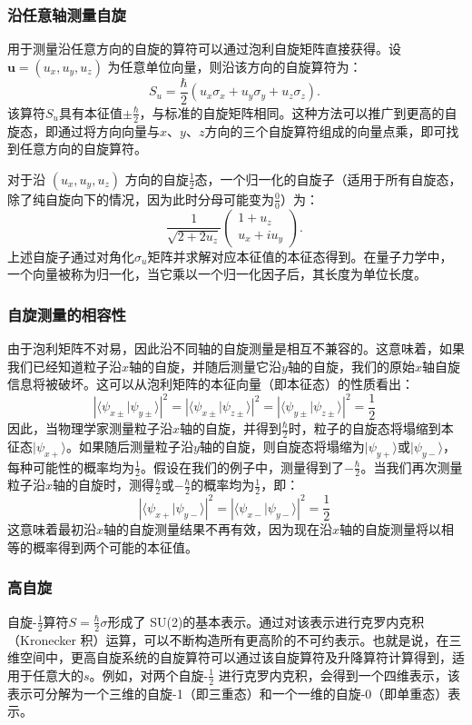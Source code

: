 \subsubsection{沿任意轴测量自旋}
用于测量沿任意方向的自旋的算符可以通过泡利自旋矩阵直接获得。设\( \mathbf{u} = (u_x, u_y, u_z) \) 为任意单位向量，则沿该方向的自旋算符为：  
\[
S_u = \frac{\hbar}{2} (u_x \sigma_x + u_y \sigma_y + u_z \sigma_z).~
\]
该算符\(S_u\)具有本征值\(\pm \frac{\hbar}{2}\)，与标准的自旋矩阵相同。这种方法可以推广到更高的自旋态，即通过将方向向量与\( x \)、\( y \)、\( z \)方向的三个自旋算符组成的向量点乘，即可找到任意方向的自旋算符。  

对于沿 \( (u_x, u_y, u_z) \) 方向的自旋\(\frac{1}{2}\)态，一个归一化的自旋子（适用于所有自旋态，除了纯自旋向下的情况，因为此时分母可能变为\(\frac{0}{0}\)）为：  
\[
\frac{1}{\sqrt{2+2u_z}} \begin{pmatrix} 1+u_z \\ u_x + i u_y \end{pmatrix}.~
\]
上述自旋子通过对角化\(\sigma_u\)矩阵并求解对应本征值的本征态得到。在量子力学中，一个向量被称为归一化，当它乘以一个归一化因子后，其长度为单位长度。
\subsubsection{自旋测量的相容性}
由于泡利矩阵不对易，因此沿不同轴的自旋测量是相互不兼容的。这意味着，如果我们已经知道粒子沿\(x\)轴的自旋，并随后测量它沿\(y\)轴的自旋，我们的原始\(x\)轴自旋信息将被破坏。这可以从泡利矩阵的本征向量（即本征态）的性质看出：
\[
\left| \langle \psi_{x\pm} | \psi_{y\pm} \rangle \right|^2 = \left| \langle \psi_{x\pm} | \psi_{z\pm} \rangle \right|^2 = \left| \langle \psi_{y\pm} | \psi_{z\pm} \rangle \right|^2 = \frac{1}{2}~
\]
因此，当物理学家测量粒子沿\(x\)轴的自旋，并得到\(\frac{\hbar}{2}\)时，粒子的自旋态将塌缩到本征态\(|\psi_{x+} \rangle\)。如果随后测量粒子沿\(y\)轴的自旋，则自旋态将塌缩为\(|\psi_{y+} \rangle\)或\( |\psi_{y-} \rangle \)，每种可能性的概率均为\(\frac{1}{2}\)。假设在我们的例子中，测量得到了\(-\frac{\hbar}{2}\)。当我们再次测量粒子沿\(x\)轴的自旋时，测得\(\frac{\hbar}{2}\)或\(-\frac{\hbar}{2}\)的概率均为\(\frac{1}{2}\)，即：
\[
\left| \langle \psi_{x+} | \psi_{y-} \rangle \right|^2 = \left| \langle \psi_{x-} | \psi_{y-} \rangle \right|^2 = \frac{1}{2}~
\]
这意味着最初沿\(x\)轴的自旋测量结果不再有效，因为现在沿\(x\)轴的自旋测量将以相等的概率得到两个可能的本征值。
\subsubsection{高自旋} 
自旋-\(\frac{1}{2}\)算符\( S = \frac{\hbar}{2}\sigma\)形成了 SU(2)的基本表示。通过对该表示进行克罗内克积（Kronecker 积）运算，可以不断构造所有更高阶的不可约表示。也就是说，在三维空间中，更高自旋系统的自旋算符可以通过该自旋算符及升降算符计算得到，适用于任意大的\(s \)。例如，对两个自旋-\(\frac{1}{2}\) 进行克罗内克积，会得到一个四维表示，该表示可分解为一个三维的自旋-1（即三重态）和一个一维的自旋-0（即单重态）表示。  

